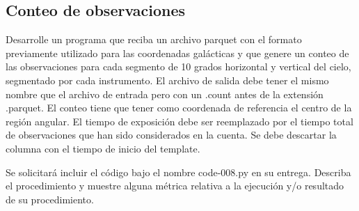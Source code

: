 \documentclass[12pt,letterpaper,twoside]{article}
\begin{document}
\begin{code}[H]
    
\end{code}

\subsection{Conteo de observaciones}

{\color{red} Desarrolle un programa que reciba un archivo parquet con el formato previamente utilizado para las coordenadas galácticas y que genere un conteo de las observaciones para cada segmento de 10 grados horizontal y vertical del cielo, segmentado por cada instrumento. El archivo de salida debe tener el mismo nombre que el archivo de entrada pero con un .count antes de la extensión .parquet. El conteo tiene que tener como coordenada de referencia el centro de la región angular. El tiempo de exposición debe ser reemplazado por el tiempo total de observaciones que han sido considerados en la cuenta. Se debe descartar la columna con el tiempo de inicio del template.

    Se solicitará incluir el código bajo el nombre code-008.py en su entrega. Describa el procedimiento y muestre alguna métrica relativa a la ejecución y/o resultado de su procedimiento.}

\begin{code}[H]
    
\end{code}
\end{document}
